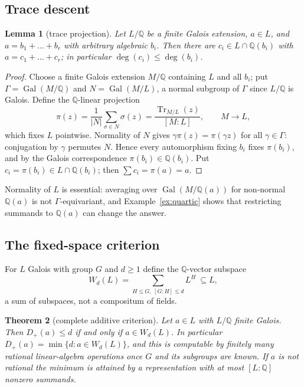 \documentclass[11pt,a4paper]{article}
\newtheorem{theorem}{Theorem}[section]
\newtheorem{lemma}[theorem]{Lemma}
\theoremstyle{definition}
\theoremstyle{remark}
\newcommand{\Q}{\mathbb{Q}}
\newcommand{\Gal}{\operatorname{Gal}}
\newcommand{\Tr}{\operatorname{Tr}}
\newcommand{\dg}{\deg}
\newcommand{\Dp}{D_{+}}
\begin{document}
\subsection{Trace descent}

\begin{lemma}[trace projection]\label{lem:trace}
Let $L/\Q$ be a finite Galois extension, $a\in L$, and $a=b_1+\dots+b_r$ with arbitrary algebraic $b_i$.
Then there are $c_i\in L\cap\Q(b_i)$ with $a=c_1+\dots+c_r$; in particular $\dg(c_i)\le\dg(b_i)$.
\end{lemma}

\begin{proof}
Choose a finite Galois extension $M/\Q$ containing $L$ and all $b_i$; put $\Gamma=\Gal(M/\Q)$ and
$N=\Gal(M/L)$, a normal subgroup of $\Gamma$ since $L/\Q$ is Galois.  Define the $\Q$-linear projection
\[
 \pi(z)=\frac1{|N|}\sum_{\sigma\in N}\sigma(z)=\frac{\Tr_{M/L}(z)}{[M:L]},\qquad M\to L,
\]
which fixes $L$ pointwise.  Normality of $N$ gives $\gamma\pi(z)=\pi(\gamma z)$ for all
$\gamma\in\Gamma$: conjugation by $\gamma$ permutes $N$.  Hence every automorphism fixing $b_i$ fixes
$\pi(b_i)$, and by the Galois correspondence $\pi(b_i)\in\Q(b_i)$.  Put $c_i=\pi(b_i)\in L\cap\Q(b_i)$;
then $\sum c_i=\pi(a)=a$.
\end{proof}

Normality of $L$ is essential: averaging over $\Gal(M/\Q(a))$ for non-normal $\Q(a)$ is not
$\Gamma$-equivariant, and Example~\ref{ex:quartic} shows that restricting summands to $\Q(a)$ can
change the answer.

\subsection{The fixed-space criterion}

For $L$ Galois with group $G$ and $d\ge1$ define the $\Q$-vector subspace
\begin{equation}\label{eq:Wd}
 W_d(L)=\sum_{H\le G,\ [G:H]\le d}L^H\ \subseteq L,
\end{equation}
a sum of subspaces, not a compositum of fields.

\begin{theorem}[complete additive criterion]\label{thm:sum}
Let $a\in L$ with $L/\Q$ finite Galois.  Then $\Dp(a)\le d$ if and only if $a\in W_d(L)$.  In
particular $\Dp(a)=\min\{d: a\in W_d(L)\}$, and this is computable by finitely many rational
linear-algebra operations once $G$ and its subgroups are known.  If $a$ is not rational the minimum
is attained by a representation with at most $[L:\Q]$ nonzero summands.
\end{theorem}
\end{document}
